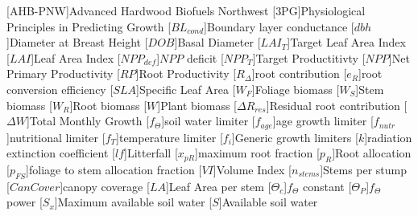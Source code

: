 \usepackage[printonlyused]{acronym}
[AHB-PNW]{Advanced Hardwood Biofuels Northwest}
[\textsc{3PG}]{Physiological Principles in Predicting Growth}
[\ensuremath{BL_{cond}}]{Boundary layer conductance}
[\ensuremath{dbh}]{Diameter at Breast Height}
[\ensuremath{DOB}]{Basal Diameter}
[\ensuremath{LAI_{T}}]{Target Leaf Area Index}
[\ensuremath{LAI}]{Leaf Area Index}
[\ensuremath{NPP_{def}}]{$NPP$ deficit}
[\ensuremath{NPP_{T}}]{Target Productitivty}
[\ensuremath{NPP}]{Net Primary Productivity}
[\ensuremath{RP}]{Root Productivity}
[\ensuremath{R_{\Delta}}]{root contribution}
[\ensuremath{e_{R}}]{root conversion efficiency}
[\ensuremath{SLA}]{Specific Leaf Area}
[\ensuremath{W_F}]{Foliage biomass}
[\ensuremath{W_S}]{Stem biomass}
[\ensuremath{W_R}]{Root biomass}
[\ensuremath{W}]{Plant biomass}
[\ensuremath{\Delta R_{res}}]{Residual root contribution}
[\ensuremath{\Delta W}]{Total Monthly Growth}
[\ensuremath{f_\Theta}]{soil water limiter}
[\ensuremath{f_{age}}]{age growth limiter}
[\ensuremath{f_{nutr}}]{nutritional limiter}
[\ensuremath{f_T}]{temperature limiter}
[\ensuremath{f_i}]{Generic growth limiters}
[\ensuremath{k}]{radiation extinction coefficient}
[\ensuremath{lf}]{Litterfall}
[\ensuremath{x_{pR}}]{maximum root fraction}
[\ensuremath{p_R}]{Root allocation}
[\ensuremath{p_{FS}}]{foliage to stem allocation fraction}
[\ensuremath{VI}]{Volume Index}
[\ensuremath{n_{stems}}]{Stems per stump}
[\ensuremath{CanCover}]{canopy coverage}
[\ensuremath{LA}]{Leaf Area per stem}
[\ensuremath{\Theta_{c}}]{$f_\Theta$ constant}
[\ensuremath{\Theta_{P}}]{$f_\Theta$ power}
[\ensuremath{S_x}]{Maximum available soil water}
[\ensuremath{S}]{Available soil water}


